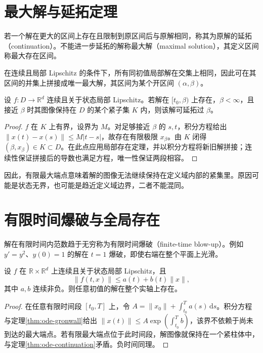 \section{最大解与延拓定理}
\begin{definition}
若一个解在更大的区间上存在且限制到原区间后与原解相同，称其为原解的延拓（continuation）。不能进一步延拓的解称最大解（maximal solution），其定义区间称最大存在区间。
\end{definition}

在连续且局部 Lipschitz 的条件下，所有同初值局部解在交集上相同，因此可在其区间的并集上拼接成唯一最大解，其区间为某个开区间 $(\alpha,\beta)$。

\begin{theorem}[有限端点的延拓判据]
\label{thm:ode-continuation}
设 $f:D\to\mathbb R^d$ 连续且关于状态局部 Lipschitz。若解在 $[t_0,\beta)$ 上存在，$\beta<\infty$，且接近 $\beta$ 时其图像保持在 $D$ 的某个紧子集 $K$ 内，则该解可延拓过 $\beta$。
\end{theorem}
\begin{proof}
$f$ 在 $K$ 上有界，设界为 $M$。对足够接近 $\beta$ 的 $s,t$，积分方程给出 $\|x(t)-x(s)\|\leq M|t-s|$，故存在有限极限 $x_\beta$。由 $K$ 闭得 $(\beta,x_\beta)\in K\subset D$。在此点应用局部存在定理，并以积分方程将新旧解拼接；连续性保证拼接后的导数也满足方程，唯一性保证两段相容。
\end{proof}

因此，有限最大端点意味着解的图像无法继续保持在定义域内部的紧集里。原因可能是状态无界，也可能是趋近定义域边界，二者不能混同。

\section{有限时间爆破与全局存在}
解在有限时间内范数趋于无穷称为有限时间爆破（finite-time blow-up）。例如 $y'=y^2$、$y(0)=1$ 的解在 $t=1$ 爆破，即使右端在整个平面上光滑。

\begin{theorem}[线性增长条件]
设 $f$ 在 $\mathbb R\times\mathbb R^d$ 上连续且关于状态局部 Lipschitz，且
\[
 \|f(t,x)\|\leq a(t)+b(t)\|x\|,
\]
其中 $a,b$ 连续非负。则任意初值的解在整个实轴上存在。
\end{theorem}
\begin{proof}
在任意有限时间段 $[t_0,T]$ 上，令 $A=\|x_0\|+\int_{t_0}^T a(s)\,\mathrm ds$。积分方程与定理\ref{thm:ode-gronwall}给出 $\|x(t)\|\leq A\exp(\int_{t_0}^T b)$，该界不依赖于尚未到达的最大端点。若有限最大端点位于此时间段，解图像就保持在一个紧柱体中，与定理\ref{thm:ode-continuation}矛盾。负时间同理。
\end{proof}

